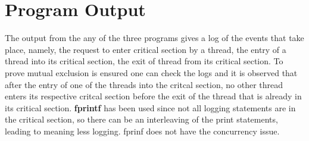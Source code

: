 \documentclass[a4paper,12pt]{report}
\begin{document}
\section{Program Output}
The output from the any of the three programs gives a log of the events that take place, namely, the request to enter critical section by a thread, the entry of a thread into its critical section, the exit of thread from its critical section. To prove mutual exclusion is ensured one can check the logs and it is observed that after the entry of one of the threads into the critcal section, no other thread enters its respective critcal section before the exit of the thread that is already in its critical section.
\textbf{fprintf }has been used since not all logging statements are in the critical section, so there can be an interleaving of the print statements, leading to meaning less logging. fprinf does not have the concurrency issue.
\newpage
\end{document}
